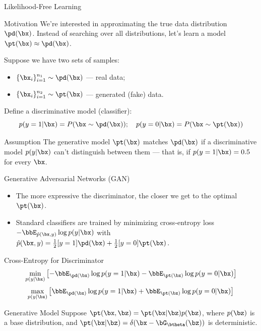 \documentclass{beamer}
\begin{document}
\begin{frame}{Likelihood-Free Learning}
	\begin{block}{Motivation}
	 We're interested in approximating the true data distribution~$\pd(\bx)$.
	Instead of searching over all distributions, let's learn a model $\pt(\bx) \approx \pd(\bx)$.
	\end{block}
	\eqpause
	Suppose we have two sets of samples: 
	\begin{itemize}
		\item $\{\bx_i\}_{i=1}^{n_1} \sim \pd(\bx)$ — real data;
		\item $\{\bx_i\}_{i=1}^{n_2} \sim \pt(\bx)$ — generated (fake) data.
	\end{itemize}
	\eqpause
	Define a discriminative model (classifier):
	\[
		p(y = 1 | \bx) = P(\bx \sim \pd(\bx)); \quad p(y = 0 | \bx) = P(\bx \sim \pt(\bx))
	\]
	\eqpause
	\vspace{-0.5cm}
	\begin{block}{Assumption}
		The generative model $\pt(\bx)$ matches $\pd(\bx)$ if a discriminative model $p(y | \bx)$ can't distinguish between them --- that is, if $p(y = 1 | \bx) = 0.5$ for every $\bx$.
	\end{block}
\end{frame}
\begin{frame}{Generative Adversarial Networks (GAN)}
	\begin{itemize}
		\item The more expressive the discriminator, the closer we get to the optimal $\pt(\bx)$.
		\item Standard classifiers are trained by minimizing cross-entropy loss $-\bbE_{\hat{p}(\bx, y)} \log p(y | \bx)$ with $\hat{p}(\bx, y) = \frac{1}{2} [y=1]\pd(\bx) + \frac{1}{2} [y=0]\pt(\bx)$.
	\end{itemize}
	\eqpause
	\begin{block}{Cross-Entropy for Discriminator}
		\vspace{-0.3cm}
		\[
			\min_{p(y | \bx)} \left[ - \bbE_{\pd(\bx)} \log p(y = 1 | \bx) - \bbE_{\pt(\bx)} \log p(y = 0 | \bx) \right] 
		\]
		\[
			\max_{p(y | \bx)} \left[\bbE_{\pd(\bx)} \log p(y = 1 | \bx) + \bbE_{\pt(\bx)} \log p(y = 0 | \bx) \right] 
		\]
	\end{block}
	\eqpause
	\vspace{-0.3cm}
	\begin{block}{Generative Model}
		Suppose $\pt(\bx, \bz) = \pt(\bx| \bz) p(\bz)$, where $p(\bz)$ is a base distribution, and $\pt(\bx | \bz) = \delta (\bx - \bG_{\btheta}(\bz))$ is deterministic.
	\end{block}
\end{frame}
\end{document}
